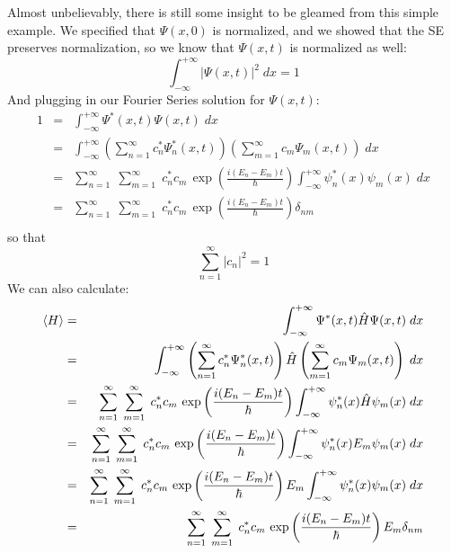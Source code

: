 \documentclass[12pt]{book}
\begin{document}
Almost unbelievably, there is still some insight to be gleamed from this simple example.  We specified that $\Psi(x,0)$ is normalized, and we showed that the SE preserves normalization, so we know that $\Psi(x,t)$ is normalized as well:
\begin{equation*}
\int_{-\infty}^{+\infty} |\Psi(x,t)|^2 \; dx = 1
\end{equation*}
And plugging in our Fourier Series solution for $\Psi(x,t)$:
\begin{eqnarray*}
1 &=& \int_{-\infty}^{+\infty} \Psi^*(x,t)\Psi(x,t) \; dx \\
  &=& \int_{-\infty}^{+\infty} \left( \sum_{n=1}^{\infty} c_n^* \Psi_n^*(x,t) \right) \left( \sum_{m=1}^{\infty} c_m \Psi_m(x,t) \right) \; dx \\
  &=& \sum_{n=1}^{\infty} \; \sum_{m=1}^{\infty} \; c_n^* c_m  \, \exp\left(\frac{i(E_n-E_m)t}{\hbar}\right) \int_{-\infty}^{+\infty} \psi_n^*(x) \psi_m(x) \; dx \\
  &=& \sum_{n=1}^{\infty} \; \sum_{m=1}^{\infty} \; c_n^* c_m  \, \exp\left(\frac{i(E_n-E_m)t}{\hbar}\right) \delta_{nm} \\
\end{eqnarray*}
so that  
\begin{equation}  
\sum_{n=1}^{\infty} |c_n|^2 = 1
\end{equation}
We can also calculate:
\begin{eqnarray*}
\braket{H} &=& \int_{-\infty}^{+\infty} \Psi^*(x,t)\hat{H}\Psi(x,t) \; dx \\
  &=& \int_{-\infty}^{+\infty} \left( \sum_{n=1}^{\infty} c_n^* \Psi_n^*(x,t) \right) \hat{H}\left( \sum_{m=1}^{\infty} c_m \Psi_m(x,t) \right) \; dx \\
  &=& \sum_{n=1}^{\infty} \; \sum_{m=1}^{\infty} \; c_n^* c_m \, \exp\left(\frac{i(E_n-E_m)t}{\hbar}\right) \int_{-\infty}^{+\infty} \psi_n^*(x) \hat{H} \psi_m(x) \; dx \\
  &=& \sum_{n=1}^{\infty} \; \sum_{m=1}^{\infty} \; c_n^* c_m \, \exp\left(\frac{i(E_n-E_m)t}{\hbar}\right) \int_{-\infty}^{+\infty} \psi_n^*(x) E_m \psi_m(x) \; dx \\
  &=& \sum_{n=1}^{\infty} \; \sum_{m=1}^{\infty} \; c_n^* c_m \, \exp\left(\frac{i(E_n-E_m)t}{\hbar}\right) E_m \int_{-\infty}^{+\infty} \psi_n^*(x) \psi_m(x) \; dx \\
  &=& \sum_{n=1}^{\infty} \; \sum_{m=1}^{\infty} \; c_n^* c_m  \, \exp\left(\frac{i(E_n-E_m)t}{\hbar}\right) E_m \delta_{nm} \\
\end{eqnarray*}
\end{document}
